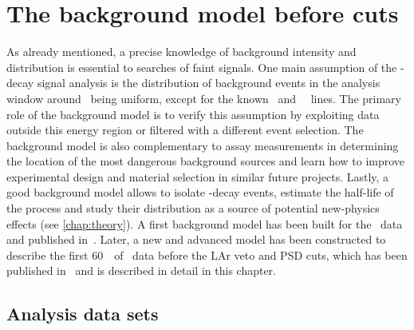 
\chapter{The background model before cuts}\label{chap:bkg:raw:ph2}

As already mentioned, a precise knowledge of background intensity and distribution is
essential to searches of faint signals. One main assumption of the \onbb-decay signal
analysis is the distribution of background events in the analysis window around \qbb\
being uniform, except for the known \Tl\ and \Bil\ \g\ lines. The primary role of the
background model is to verify this assumption by exploiting data outside this energy
region or filtered with a different event selection. The background model is also
complementary to assay measurements in determining the location of the most dangerous
background sources and learn how to improve experimental design and material selection in
similar future projects. Lastly, a good background model allows to isolate \nnbb-decay
events, estimate the half-life of the process and study their distribution as a source of
potential new-physics effects (see \cref{chap:theory}).
\newpar
A first background model has been built for the \phaseone\ data and published
in~\cite{Agostini2013a}. Later, a new and advanced model has been constructed to describe
the first 60~\kgyr\ of \phasetwo\ data before the LAr veto and PSD cuts, which has been
published in~\cite{Agostini2019b} and is described in detail in this chapter.

\section{Analysis data sets}%
\label{sec:bkg:raw:data}

\begin{table}[b]
  \centering
  \caption{%
    Properties of the data sets considered in this analysis. Further
    details about the \gerda\ detectors can be found in past
    publications~\cite{Agostini2013a, Agostini2018a}.
  }\label{tab:bkg:raw:ph2:datasets}
  \small
  
\end{table}%

